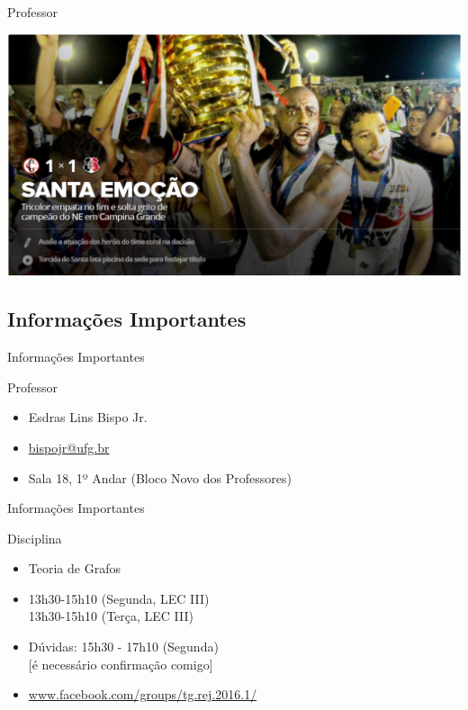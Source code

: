 \documentclass[xcolor=dvipsnames,table]{beamer}
\begin{document}
	\begin{frame}{Professor}
		\begin{center}
    		\includegraphics[height=.65\textheight]{images/santa.png}
  		\end{center}
	\end{frame}
	
	\subsection{Informações Importantes}
	\begin{frame}{Informações Importantes}
		\begin{block}{Professor}
			\begin{itemize}
				\item Esdras Lins Bispo Jr.
				\item \url{bispojr@ufg.br}
				\item Sala 18, 1º Andar (Bloco Novo dos Professores)
			\end{itemize}
		\end{block}
	\end{frame}	
	
	\begin{frame}{Informações Importantes}
		\begin{block}{Disciplina}
			\begin{itemize}
				\item Teoria de Grafos
				\item 13h30-15h10 (Segunda, LEC III)\\
					  13h30-15h10 (Terça, LEC III)
				\item Dúvidas: 15h30 - 17h10 (Segunda)\\
					  {\color{red}[é necessário confirmação comigo]}
				\item \url{www.facebook.com/groups/tg.rej.2016.1/}
			\end{itemize}
		\end{block}
	\end{frame}
	
\end{document}
